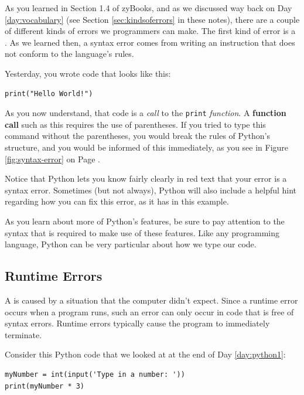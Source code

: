 As you learned in Section 1.4 of zyBooks, and as we discussed way back on Day \ref{day:vocabulary} (see Section \ref{sec:kindsoferrors} in these notes), there are a couple of different kinds of errors we programmers can make.  The first kind of error is a .  As we learned then, a syntax error comes from writing an instruction that does not conform to the language's rules.

Yesterday, you wrote code that looks like this:

\begin{verbatim}
print("Hello World!")
\end{verbatim}

As you now understand, that code is a \textit{call} to the \texttt{print} \textit{function}.  A \textbf{function call} such as this requires the use of parentheses.  If you tried to type this command without the parentheses, you would break the rules of Python's structure, and you would be informed of this immediately, as you see in Figure \ref{fig:syntax-error} on Page \pageref{fig:syntax-error}.

Notice that Python lets you know fairly clearly in red text that your error is a syntax error.  Sometimes (but not always), Python will also include a helpful hint regarding how you can fix this error, as it has in this example.

As you learn about more of Python's features, be sure to pay attention to the syntax that is required to make use of these features.  Like any programming language, Python can be very particular about how we type our code.

\subsection{Runtime Errors}

A  is caused by a situation that the computer didn't expect.  Since a runtime error occurs when a program runs, such an error can only occur in code that is free of syntax errors.  Runtime errors typically cause the program to immediately terminate.

Consider this Python code that we looked at at the end of Day \ref{day:python1}:

\begin{verbatim}
myNumber = int(input('Type in a number: '))
print(myNumber * 3)
\end{verbatim}

